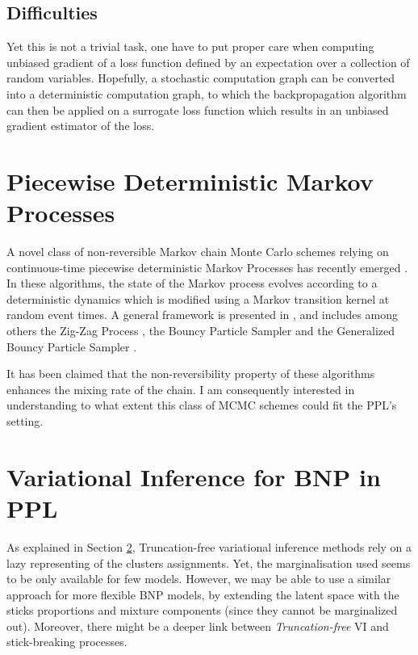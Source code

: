 \subsection{Difficulties}
Yet this is not a trivial task, one have to put proper care when computing unbiased gradient of a loss function defined by an expectation over a collection of random variables.
Hopefully, a stochastic computation graph \cite{Schulman:2015wk} can be converted into a deterministic computation graph, to which the backpropagation algorithm can then be applied on a surrogate loss function which results in an unbiased gradient estimator of the loss.


\section{Piecewise Deterministic Markov Processes}
A novel class of non-reversible Markov chain Monte Carlo schemes relying on continuous-time piecewise deterministic Markov Processes has recently emerged \cite{Vanetti:2017ux}. In these algorithms, the state of the Markov process evolves according to a deterministic dynamics which is modified using a Markov transition kernel at random event times. A general framework is presented in \cite{Bierkens:2017we}, and includes among others the Zig-Zag Process \cite{Bierkens:2016uk}, the Bouncy Particle Sampler \cite{BouchardCote:2017gs} and the Generalized Bouncy Particle Sampler \cite{Wu:2017uz}.

It has been claimed \cite{Bierkens:2017we} that the non-reversibility property of these algorithms enhances the mixing rate of the chain.
I am consequently interested in understanding to what extent this class of MCMC schemes could fit the \gls{PPL}'s setting.


\section{Variational Inference for \gls{BNP} in \gls{PPL}} \label{BNP_VI}
As explained in Section \ref{BNP_VI}, Truncation-free variational inference methods rely on a lazy representing of the clusters assignments. Yet, the marginalisation used seems to be only available for few models.
However, we may be able to use a similar approach for more flexible \gls{BNP} models, by extending the latent space with the sticks proportions and mixture components (since they cannot be marginalized out).
Moreover, there might be a deeper link between \textit{Truncation-free} \gls{VI} and stick-breaking processes.

